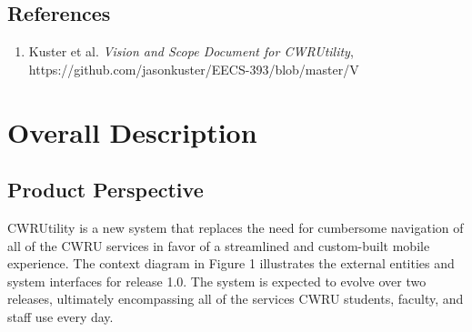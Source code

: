 \documentclass[pdftex,12pt,letter]{article}
\begin{document}
\subsection{References}
\begin{enumerate}[1.]
\item Kuster et al. \emph{Vision and Scope Document for CWRUtility}, https://github.com/jasonkuster/EECS-393/blob/master/V%
\end{enumerate}

\section{Overall Description}
\subsection{Product Perspective}
CWRUtility is a new system that replaces the need for cumbersome navigation of all of the CWRU services in favor of a streamlined and custom-built mobile experience. The context diagram in Figure 1 illustrates the external entities and system interfaces for release 1.0. The system is expected to evolve over two releases, ultimately encompassing all of the services CWRU students, faculty, and staff use every day.
\end{document}
